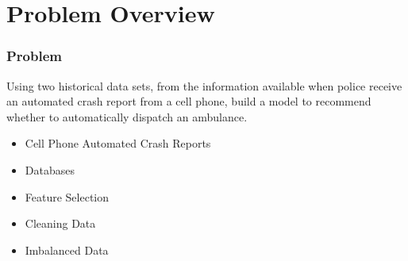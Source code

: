 \section{Problem Overview}


\begin{frame}[t]
	\frametitle{Problem}
\Large

	Using two historical data sets, from the information available when police receive an automated crash report from a cell phone, build a model to recommend whether to automatically dispatch an ambulance.  

	\begin{itemize}
		\item Cell Phone Automated Crash Reports
		\item Databases
		\item Feature Selection
		\item Cleaning Data
		\item Imbalanced Data
	\end{itemize}

\end{frame}

